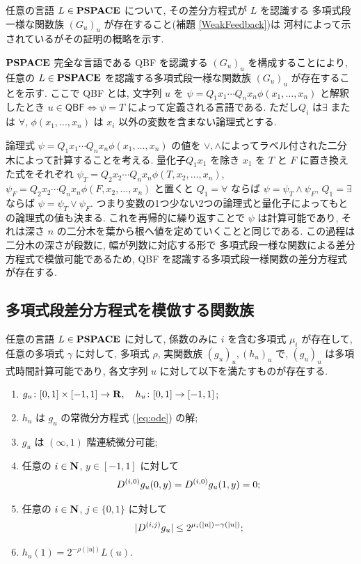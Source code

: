 任意の言語 $L \in \mathbf{PSPACE}$ について, 
その差分方程式が $L$ を認識する
多項式段一様な関数族 $(G_u)_u$ が存在すること(補題 \ref{WeakFeedback})は
河村によって示されているがその証明の概略を示す.

$\mathbf{PSPACE}$ 完全な言語である
\textsf{QBF} を認識する $(G_u)_u$ を構成することにより,
任意の $L \in \mathbf{PSPACE}$ を認識する多項式段一様な関数族 $(G_u)_u$ が存在することを示す.
ここで \textsf{QBF} とは,
文字列 $u$ を $\psi = Q_1 x_1 \cdots Q_n x_n \phi(x_1, \dots, x_n)$ と解釈したとき 
$u \in \textsf{QBF} \Leftrightarrow \psi = T$ によって定義される言語である. 
ただし$Q_i$ は$\exists$ または $\forall$,  
$\phi(x_1, \dots, x_n)$ は $x_i$ 以外の変数を含まない論理式とする. 

論理式 $\psi = Q_1 x_1 \cdots Q_n x_n \phi(x_1, \dots, x_n)$ の値を
$\vee, \wedge$によってラベル付された二分木によって計算することを考える. 
量化子$Q_1 x_1$ を除き $x_1$ を $T$ と $F$ に置き換えた式をそれぞれ
$\psi_T = Q_2 x_2 \cdots Q_n x_n \phi(T, x_2, \dots, x_n)$,
$\psi_F = Q_2 x_2 \cdots Q_n x_n \phi(F, x_2, \dots, x_n)$ と置くと
$Q_1=\forall$ ならば $\psi = \psi_T \wedge \psi_F$, 
$Q_1=\exists$ ならば $\psi = \psi_T \vee \psi_F$.
つまり変数の1つ少ない2つの論理式と量化子によってもとの論理式の値も決まる.
これを再帰的に繰り返すことで $\psi$ は計算可能であり, 
それは深さ $n$ の二分木を葉から根へ値を定めていくことと同じである.
この過程は二分木の深さが段数に, 幅が列数に対応する形で
多項式段一様な関数による差分方程式で模倣可能であるため,
\textsf{QBF} を認識する多項式段一様関数の差分方程式が存在する.



\subsection{多項式段差分方程式を模倣する関数族}


\begin{lemma}
 \label{DifferentiableFamily}
 任意の言語 $L \in \mathbf{PSPACE}$ に対して, 
 係数のみに $i$ を含む多項式 $\mu_i$ が存在して,
 任意の多項式 $\gamma$ に対して,
 多項式 $\rho$, 実関数族 $(g_u)_u, (h_u)_u$ で, 
 $(g_u)_u$ は多項式時間計算可能であり,
 各文字列 $u$ に対して以下を満たすものが存在する.
 \begin{enumerate}
  \item $g_u\colon [0,1] \times [-1,1]\to \mathbf R, \quad h_u\colon [0,1] \to [-1,1]$;
  \item $h_u$ は $g_u$ の常微分方程式 (\ref{eq:ode}) の解; 
  \item $g_u$ は $(\infty, 1)$ 階連続微分可能;
  \item 任意の $i \in \mathbf N$, $y \in [-1,1]$ に対して
	\begin{equation*}
	 D ^{(i, 0)} g_u(0,y) = D ^{(i, 0)} g_u(1,y) = 0;
	\end{equation*}
  \item \label{enum:infty1}
	任意の $i \in \mathbf N$, $j \in \{0,1\}$ に対して
	\begin{equation*}
	 |D ^{(i,j)} g_u| \leq 2^{\mu_i (|u|) - \gamma(|u|)};
	\end{equation*}
  \item $h_u(1) = 2^{-\rho(|u|)}L(u)$.
 \end{enumerate}
\end{lemma}


